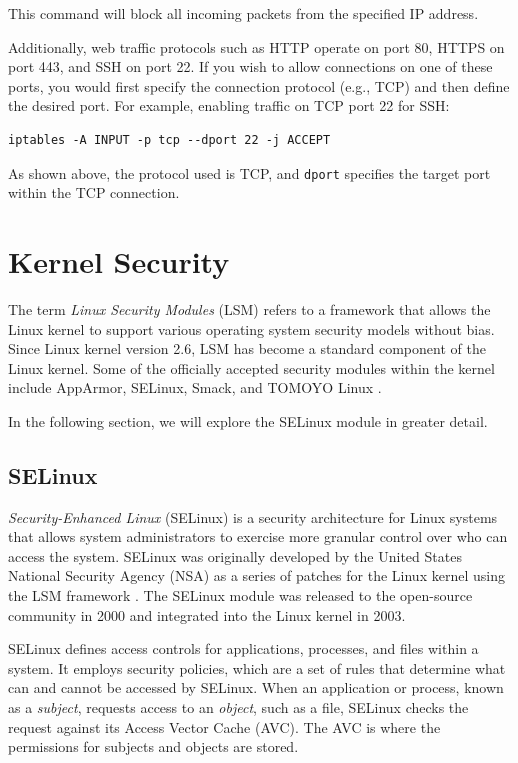 \documentclass[conference]{IEEEtran}
\begin{document}
This command will block all incoming packets from the specified IP address.

Additionally, web traffic protocols such as HTTP operate on port 80, HTTPS on port 443, and SSH on port 22. If you wish to allow connections on one of these ports, you would first specify the connection protocol (e.g., TCP) and then define the desired port. For example, enabling traffic on TCP port 22 for SSH:

\begin{verbatim}
iptables -A INPUT -p tcp --dport 22 -j ACCEPT
\end{verbatim}

As shown above, the protocol used is TCP, and \texttt{dport} specifies the target port within the TCP connection.

\section{Kernel Security}

The term \textit{Linux Security Modules} (LSM) refers to a framework that allows the Linux kernel to support various operating system security models without bias. Since Linux kernel version 2.6, LSM has become a standard component of the Linux kernel. Some of the officially accepted security modules within the kernel include AppArmor, SELinux, Smack, and TOMOYO Linux \cite{linux-training}.

In the following section, we will explore the SELinux module in greater detail.

\subsection{SELinux}

\textit{Security-Enhanced Linux} (SELinux) is a security architecture for Linux systems that allows system administrators to exercise more granular control over who can access the system. SELinux was originally developed by the United States National Security Agency (NSA) as a series of patches for the Linux kernel using the LSM framework \cite{geeksforgeeks-acl}. The SELinux module was released to the open-source community in 2000 and integrated into the Linux kernel in 2003.

SELinux defines access controls for applications, processes, and files within a system. It employs security policies, which are a set of rules that determine what can and cannot be accessed by SELinux. When an application or process, known as a \textit{subject}, requests access to an \textit{object}, such as a file, SELinux checks the request against its Access Vector Cache (AVC). The AVC is where the permissions for subjects and objects are stored.
\end{document}
